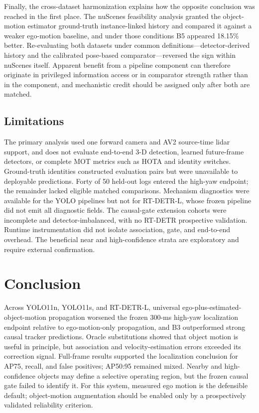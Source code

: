 \documentclass[journal]{IEEEtran}
\begin{document}
Finally, the cross-dataset harmonization explains how the opposite conclusion was reached in the first place. The nuScenes feasibility analysis \cite{Caesar2020nuScenes} granted the object-motion estimator ground-truth instance-linked history and compared it against a weaker ego-motion baseline, and under those conditions B5 appeared 18.15\% better. Re-evaluating both datasets under common definitions---detector-derived history and the calibrated pose-based comparator---reversed the sign within nuScenes itself. Apparent benefit from a pipeline component can therefore originate in privileged information access or in comparator strength rather than in the component, and mechanistic credit should be assigned only after both are matched.

\subsection{Limitations}
The primary analysis used one forward camera and AV2 source-time lidar support, and does not evaluate end-to-end 3-D detection, learned future-frame detectors, or complete MOT metrics such as HOTA and identity switches. Ground-truth identities constructed evaluation pairs but were unavailable to deployable predictions. Forty of 50 held-out logs entered the high-yaw endpoint; the remainder lacked eligible matched comparisons. Mechanism diagnostics were available for the YOLO pipelines but not for RT-DETR-L, whose frozen pipeline did not emit all diagnostic fields. The causal-gate extension cohorts were incomplete and detector-imbalanced, with no RT-DETR prospective validation. Runtime instrumentation did not isolate association, gate, and end-to-end overhead. The beneficial near and high-confidence strata are exploratory and require external confirmation.

\balance
\section{Conclusion}
Across YOLO11n, YOLO11s, and RT-DETR-L, universal ego-plus-estimated-object-motion propagation worsened the frozen 300-ms high-yaw localization endpoint relative to ego-motion-only propagation, and B3 outperformed strong causal tracker predictions. Oracle substitutions showed that object motion is useful in principle, but association and velocity-estimation errors exceeded its correction signal. Full-frame results supported the localization conclusion for AP75, recall, and false positives; AP50:95 remained mixed. Nearby and high-confidence objects may define a selective operating region, but the frozen causal gate failed to identify it. For this system, measured ego motion is the defensible default; object-motion augmentation should be enabled only by a prospectively validated reliability criterion.
\end{document}
